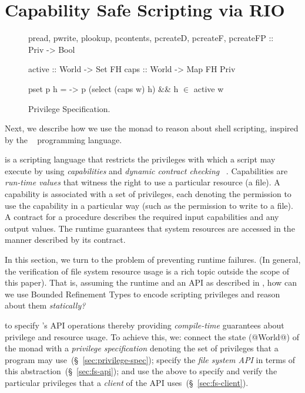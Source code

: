 \section{Capability Safe Scripting via RIO}
\label{sec:files}\label{subsec:state:files}

\begin{figure}[!ht]
\centering
\captionsetup{justification=centering}
\begin{mcode}
  pread, pwrite, plookup, pcontents,
  pcreateD, pcreateF, pcreateFP :: Priv -> Bool

  active   :: World -> Set FH 
  caps     :: World -> Map FH Priv

  pset p h = \w -> p (select (caps w) h) && h $\in$ active w
\end{mcode}
\caption{Privilege Specification.}
\label{fig:fstypes} 
\end{figure}

Next, we describe how we use the \RIO monad to reason about shell
scripting, inspired by the \shill~\citep{shill} programming language.
%

 is a scripting language that restricts the
privileges with which a script may execute by using
\emph{capabilities} and \emph{dynamic contract checking}~\citep{shill} .
%
Capabilities are \emph{run-time values} 
that witness the right to use a particular resource 
(\eg a file).
%
A capability is associated with a set of privileges, 
each denoting the permission to use the capability 
in a particular way (such as the permission to write 
to a file).
%
A contract for a \shill procedure describes the 
required input capabilities and any output values.
%
The \shill runtime guarantees that system resources are accessed in
the manner described by its contract.

In this section, we turn to the problem of
preventing \shill runtime failures.
%
(In general, the verification of file system resource usage is a rich
topic outside the scope of this paper).
%
That is, assuming the \shill runtime and an API as described in
\cite{shill}, how can we use Bounded Refinement Types to encode
scripting privileges and reason about them \emph{statically?}

 to specify \shill 's API operations
%
thereby providing \emph{compile-time} guarantees 
about privilege and resource usage.
%
To achieve this, we:
%
connect the state (@World@) of the \RIO monad with a
\emph{privilege specification} denoting the set of 
privileges that a program may use~(\S~\ref{sec:privilege-spec});
%
specify the \emph{file system API} in terms of this
abstraction~(\S~\ref{sec:fs-api});
%
and use the above to specify and verify the particular 
privileges that a \emph{client} of the API uses~(\S~\ref{sec:fs-client}).

